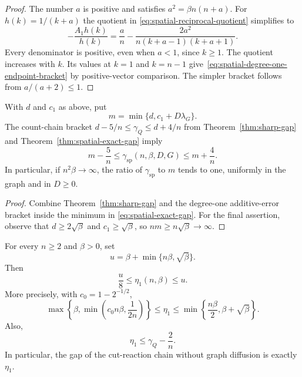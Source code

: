\begin{proof}
The number $a$ is positive and satisfies $a^2=\beta n(n+a)$.
For $h(k)=1/(k+a)$ the quotient in
\eqref{eq:spatial-reciprocal-quotient} simplifies to
\begin{equation}\label{eq:spatial-sharp-reciprocal-quotient}
 -\frac{A_1h(k)}{h(k)}
 =\frac an-\frac{2a^2}{n(k+a-1)(k+a+1)}.
\end{equation}
Every denominator is positive, even when $a<1$, since $k\geq1$.
The quotient increases with $k$.  Its values at $k=1$ and $k=n-1$
give~\eqref{eq:spatial-degree-one-endpoint-bracket} by positive-vector
comparison.  The simpler bracket follows from $a/(a+2)\leq1$.
\end{proof}

\begin{corollary}
\label{cor:spatial-leading-constants}
With $d$ and $c_1$ as above, put
\[
 m=\min\{d,c_1+D\lambda_G\}.
\]
The count-chain bracket $d-5/n\leq\gamma_Q\leq d+4/n$ from
Theorem~\ref{thm:sharp-gap} and
Theorem~\ref{thm:spatial-exact-gap} imply
\begin{equation}\label{eq:spatial-leading-constants}
 m-\frac5n\leq\gamma_{\mathrm{sp}}(n,\beta,D,G)
 \leq m+\frac4n.
\end{equation}
In particular, if $n^2\beta\longrightarrow\infty$, the ratio of
$\gamma_{\mathrm{sp}}$ to $m$ tends to one, uniformly in the graph
and in $D\geq0$.
\end{corollary}

\begin{proof}
Combine Theorem~\ref{thm:sharp-gap} and the degree-one additive-error
bracket inside the minimum in
\eqref{eq:spatial-exact-gap}.  For the final assertion, observe that
$d\geq2\sqrt\beta$ and $c_1\geq\sqrt\beta$, so
$nm\geq n\sqrt\beta\longrightarrow\infty$.
\end{proof}

\begin{proposition}
\label{prop:spatial-degree-one-scale}
For every $n\geq2$ and $\beta>0$, set
\[
 u=\beta+\min\{n\beta,\sqrt\beta\}.
\]
Then
\begin{equation}\label{eq:spatial-degree-one-scale}
 \frac u8\leq\eta_1(n,\beta)\leq u.
\end{equation}
More precisely, with $c_0=1-2^{-1/2}$,
\begin{equation}\label{eq:spatial-degree-one-auxiliary}
 \max\left\{\beta,\min\left(c_0n\beta,\frac1{2n}\right)\right\}
 \leq\eta_1
 \leq\min\left\{\frac{n\beta}{2},\beta+\sqrt\beta\right\}.
\end{equation}
Also,
\begin{equation}\label{eq:spatial-degree-one-below-count}
 \eta_1\leq\gamma_Q-\frac2n.
\end{equation}
In particular, the gap of the cut-reaction chain without graph
diffusion is exactly $\eta_1$.
\end{proposition}


